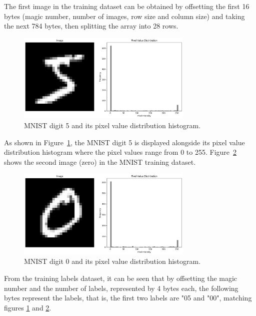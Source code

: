 The first image in the training dataset can be obtained by offsetting the first 16 bytes (magic number, number of images, row size and column size) and taking the next 784 bytes, then splitting the array into 28 rows.


\begin{figure}[h]
    \centering
    \includegraphics[width=0.75\textwidth]{Figures/Methods/MNIST_5_with_histogram.png}
    \caption{MNIST digit 5 and its pixel value distribution histogram.}
    \label{fig:mnist_5_histogram}
\end{figure}
As shown in Figure~\ref{fig:mnist_5_histogram}, the MNIST digit 5 is displayed alongside its pixel value distribution histogram where the pixel values range from 0 to 255. Figure~\ref{fig:mnist_0_histogram} shows the second image (zero) in the MNIST training dataset.

\begin{figure}[h]
    \centering
    \includegraphics[width=0.75\textwidth]{Figures/Methods/MNIST_0_with_histogram.png}
    \caption{MNIST digit 0 and its pixel value distribution histogram.}
    \label{fig:mnist_0_histogram}
\end{figure}

From the training labels dataset, it can be seen that by offsetting the magic number and the number of labels, represented by 4 bytes each, the following bytes represent the labels, that is, the first two labels are "05 and "00", matching figures \ref{fig:mnist_5_histogram} and \ref{fig:mnist_0_histogram}.

